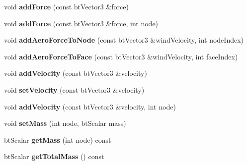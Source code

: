 \begin{DoxyCompactItemize}
\item 
\hypertarget{classbt_soft_body_a4d4cb25a0b61eee260bda46bca373960}{void {\bfseries add\+Force} (const bt\+Vector3 \&force)}\label{classbt_soft_body_a4d4cb25a0b61eee260bda46bca373960}

\item 
\hypertarget{classbt_soft_body_afdfb3e29c73cb1a67a0d006eb1e1824d}{void {\bfseries add\+Force} (const bt\+Vector3 \&force, int node)}\label{classbt_soft_body_afdfb3e29c73cb1a67a0d006eb1e1824d}

\item 
\hypertarget{classbt_soft_body_a8823d4ca2ab76dd723d8d57a9785e716}{void {\bfseries add\+Aero\+Force\+To\+Node} (const bt\+Vector3 \&wind\+Velocity, int node\+Index)}\label{classbt_soft_body_a8823d4ca2ab76dd723d8d57a9785e716}

\item 
\hypertarget{classbt_soft_body_a7334858e70ed00edaa3880afabbf5bff}{void {\bfseries add\+Aero\+Force\+To\+Face} (const bt\+Vector3 \&wind\+Velocity, int face\+Index)}\label{classbt_soft_body_a7334858e70ed00edaa3880afabbf5bff}

\item 
\hypertarget{classbt_soft_body_a3407addc1014cef6327ed009f4804da7}{void {\bfseries add\+Velocity} (const bt\+Vector3 \&velocity)}\label{classbt_soft_body_a3407addc1014cef6327ed009f4804da7}

\item 
\hypertarget{classbt_soft_body_a94daa5306dfad2e4c5b29715600aed8e}{void {\bfseries set\+Velocity} (const bt\+Vector3 \&velocity)}\label{classbt_soft_body_a94daa5306dfad2e4c5b29715600aed8e}

\item 
\hypertarget{classbt_soft_body_a5befe4cdedc0cf4d002471fd25f59416}{void {\bfseries add\+Velocity} (const bt\+Vector3 \&velocity, int node)}\label{classbt_soft_body_a5befe4cdedc0cf4d002471fd25f59416}

\item 
\hypertarget{classbt_soft_body_a1aa16f724cd3f5e8431f3fec07d75b60}{void {\bfseries set\+Mass} (int node, bt\+Scalar mass)}\label{classbt_soft_body_a1aa16f724cd3f5e8431f3fec07d75b60}

\item 
\hypertarget{classbt_soft_body_a91645388270bc2f8bdf3dbf629f56201}{bt\+Scalar {\bfseries get\+Mass} (int node) const }\label{classbt_soft_body_a91645388270bc2f8bdf3dbf629f56201}

\item 
\hypertarget{classbt_soft_body_ad97bdb48f39751adbe2607f2ef3ccc19}{bt\+Scalar {\bfseries get\+Total\+Mass} () const }\label{classbt_soft_body_ad97bdb48f39751adbe2607f2ef3ccc19}


\end{DoxyCompactItemize}
